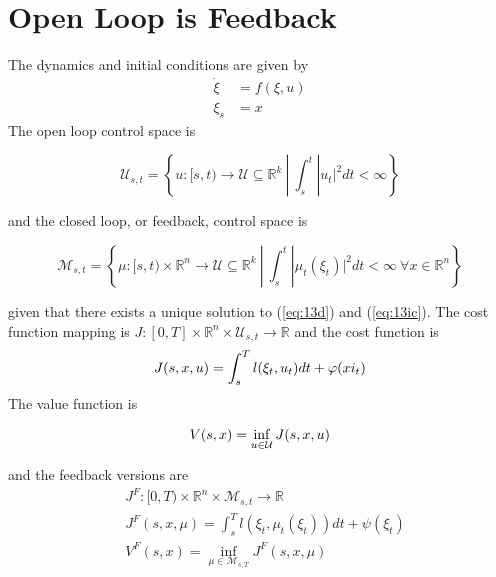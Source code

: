 \mainmatter%
\setcounter{page}{1}

\lectureseries[\course]{\course}

\date{November 12, 2009}

\setaddress%

\setcounter{lecture}{12}
\setcounter{chapter}{12}


\section{Open Loop is Feedback}
The dynamics and initial conditions are given by
\begin{align}
\label{eq:13d}
\dot{\xi} &= f(\xi,u) \\
\label{eq:13ic}
\xi_s &= x
\end{align}
The open loop control space is

\begin{equation*}
\mathcal{U}_{s,t} = \left\lbrace u:[s,t)\to\mathcal{U}\subseteq \mathbb{R}^k~|~\int_s^t |u_t|^2dt < \infty \right\rbrace%
\end{equation*}

and the closed loop, or feedback, control space is

\begin{equation*}
\mathcal{M}_{s,t} = \left\lbrace \mu:[s,t)\times\mathbb{R}^n\to\mathcal{U}\subseteq\mathbb{R}^k~|~\int_s^t |\mu_t(\xi_t)|^2dt < \infty~\forall x \in \mathbb{R}^n \right\rbrace%
\end{equation*}

given that there exists a unique solution to (\ref{eq:13d}) and (\ref{eq:13ic}).
The cost function mapping is $J:[0,T]\times\mathbb{R}^n\times\mathcal{U}_{s,t}\to\mathbb{R}$ and the cost function is
\begin{align}
\label{eq:13cost}
J(s,x,u) = \int_s^T l(\xi_t,u_t)dt + \varphi(xi_t)
\end{align}
The value function is

\begin{equation*}
V(s,x) = \inf_{u\in\mathcal{U}}J(s,x,u)
\end{equation*}

and the feedback versions are
\begin{align*}
&J^F: [0,T)\times\mathbb{R}^n\times\mathcal{M}_{s,t}\to\mathbb{R} \\%
&J^F(s,x,\mu) = \int_s^T l(\xi_t,\mu_t(\xi_t))dt + \psi(\xi_t) \\
&V^F(s,x) = \inf_{\mu\in\mathcal{M}_{s,T}}J^F(s,x,\mu)
\end{align*}

